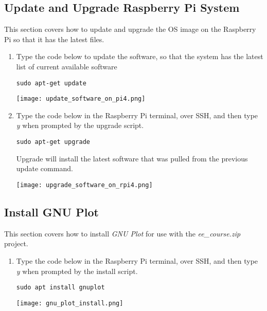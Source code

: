 \documentclass[journal]{IEEEtran}
\begin{document}
    \subsection{Update and Upgrade Raspberry Pi System}

    This section covers how to update and upgrade the OS image on the Raspberry Pi so that it has the latest files.

    \begin{enumerate}
        \item Type the code below to update the software, so that the system has the latest list of current available software
        
        \begin{lstlisting}[frame=single]
            sudo apt-get update
        \end{lstlisting}
        
        \texttt{[image: update\_software\_on\_pi4.png]}

        \item Type the code below in the Raspberry Pi terminal, over SSH, and then type \emph{y} when prompted by the upgrade script.
        
        \begin{lstlisting}[frame=single]
            sudo apt-get upgrade
        \end{lstlisting}
        
        Upgrade will install the latest software that was pulled from the previous update command. \newline 

        \texttt{[image: upgrade\_software\_on\_rpi4.png]}

    \end{enumerate}

    \subsection{Install GNU Plot}

    This section covers how to install \emph{GNU Plot} for use with the \emph{ee\_course.zip} project. \newline

    \begin{enumerate}
        \item Type the code below in the Raspberry Pi terminal, over SSH, and then type \emph{y} when prompted by the install script.
        
        \begin{lstlisting}[frame=single]
            sudo apt install gnuplot
        \end{lstlisting}

        \texttt{[image: gnu\_plot\_install.png]}

    \end{enumerate}
\end{document}
